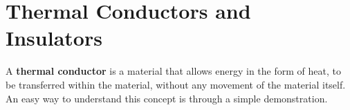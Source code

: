         \par 
    \label{m38706*cid7}
            \section{Thermal Conductors and Insulators}
            \nopagebreak
      \label{m38706*id66527}A \textbf{thermal conductor} is a material that allows energy in the form of heat, to be transferred within the material, without any movement of the material itself. An easy way to understand this concept is through a simple demonstration.\par 
{} 
\label{m38706*secfhsst!!!underscore!!!id453}
